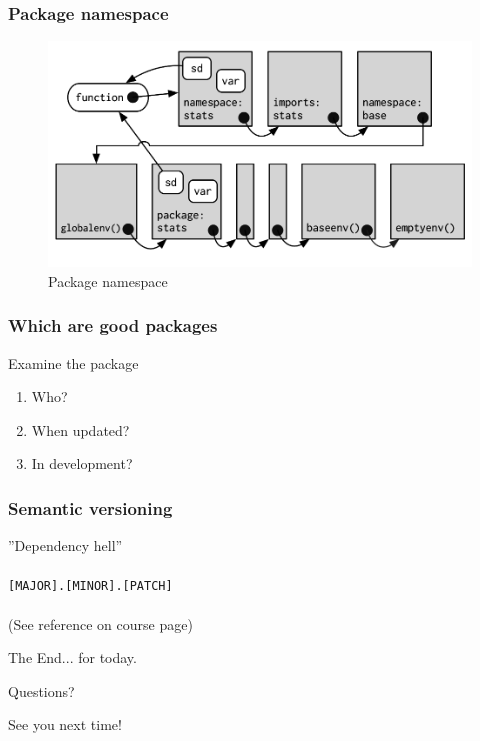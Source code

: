 \documentclass{beamer}
\begin{document}
\begin{frame}
	\frametitle{Package namespace}
	\begin{center}
			\begin{figure}[!ht]
				\includegraphics[scale=0.90]{figures/namespace}
				\caption{Package namespace}
				\label{fig:pkgns}
			\end{figure}
	\end{center}
\end{frame}

\begin{frame}
	\frametitle{Which are good packages}
	\centerline{Examine the package}
	\begin{center}
		\begin{enumerate}
			\item Who?			
			\item When updated?			
			\item In development?
		\end{enumerate}
	\end{center}
\end{frame}

\begin{frame}
	\frametitle{Semantic versioning}
	\begin{center}
	''Dependency hell'' \\~\\
	\texttt{[MAJOR].[MINOR].[PATCH]} \\~\\
	(See reference on course page)
	\end{center}
\end{frame}


\begin{frame}
\Huge{\centerline{The End... for today.}}
\Huge{\centerline{Questions?}}
\Huge{\centerline{See you next time!}}
\end{frame}

\end{document}
